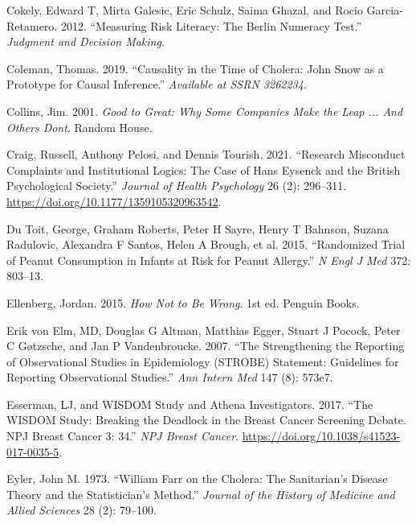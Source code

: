 \documentclass[
  10ptls,
  b5paper]{book}
\newlength{\cslhangindent}
\newlength{\cslentryspacingunit} %
\newenvironment{CSLReferences}[2] %
 {%
  \setlength{\parindent}{0pt}
  \ifodd #1
  \let\oldpar\par
  \def\par{\hangindent=\cslhangindent\oldpar}
  \fi
  \setlength{\parskip}{#2\cslentryspacingunit}
 }%
 {}
\begin{document}
\begin{CSLReferences}{1}{0}
\leavevmode{}%
Cokely, Edward T, Mirta Galesic, Eric Schulz, Saima Ghazal, and Rocio Garcia-Retamero. 2012. {``Measuring Risk Literacy: The Berlin Numeracy Test.''} \emph{Judgment and Decision Making}.

\leavevmode{}%
Coleman, Thomas. 2019. {``Causality in the Time of Cholera: John {S}now as a Prototype for Causal Inference.''} \emph{Available at SSRN 3262234}.

\leavevmode{}%
Collins, Jim. 2001. \emph{Good to Great: Why Some Companies Make the Leap ... And Others Dont}. Random House.

\leavevmode{}%
Craig, Russell, Anthony Pelosi, and Dennis Tourish. 2021. {``Research Misconduct Complaints and Institutional Logics: The Case of Hans Eysenck and the British Psychological Society.''} \emph{Journal of Health Psychology} 26 (2): 296--311. \url{https://doi.org/10.1177/1359105320963542}.

\leavevmode{}%
Du Toit, George, Graham Roberts, Peter H Sayre, Henry T Bahnson, Suzana Radulovic, Alexandra F Santos, Helen A Brough, et al. 2015. {``Randomized Trial of Peanut Consumption in Infants at Risk for Peanut Allergy.''} \emph{N Engl J Med} 372: 803--13.

\leavevmode{}%
Ellenberg, Jordan. 2015. \emph{How Not to Be Wrong}. 1st ed. Penguin Books.

\leavevmode{}%
Erik von Elm, MD, Douglas G Altman, Matthias Egger, Stuart J Pocock, Peter C Gøtzsche, and Jan P Vandenbroucke. 2007. {``The Strengthening the Reporting of Observational Studies in Epidemiology (STROBE) Statement: Guidelines for Reporting Observational Studies.''} \emph{Ann Intern Med} 147 (8): 573e7.

\leavevmode{}%
Esserman, LJ, and WISDOM Study and Athena Investigators. 2017. {``The WISDOM Study: Breaking the Deadlock in the Breast Cancer Screening Debate. NPJ Breast Cancer 3: 34.''} \emph{NPJ Breast Cancer}. \url{https://doi.org/10.1038/s41523-017-0035-5}.

\leavevmode{}%
Eyler, John M. 1973. {``William Farr on the Cholera: The Sanitarian's Disease Theory and the Statistician's Method.''} \emph{Journal of the History of Medicine and Allied Sciences} 28 (2): 79--100.


\end{CSLReferences}
\end{document}
